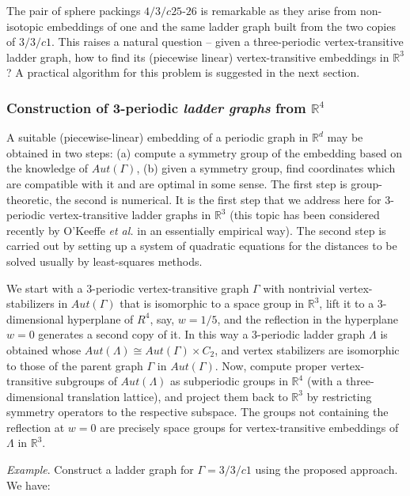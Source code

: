 \documentclass[11pt,a4paper]{article}
\newcommand{\R}{\mathbb R}
\begin{document}
The pair of sphere packings $4/3/c25\text{-}26$ is remarkable as they arise from non-isotopic embeddings of one and the same ladder graph built from the two copies of $3/3/c1$. This raises a natural question -- given a three-periodic vertex-transitive ladder graph, how to find its (piecewise linear) vertex-transitive embeddings in $\R^3$? A practical algorithm for this problem is suggested in the next section.


\subsubsection{Construction of 3-periodic \emph{ladder graphs} from $\R^4$}

A suitable (piecewise-linear) embedding of a periodic graph in $\R^d$ may be obtained in two steps: (a) compute a symmetry group of the embedding based on the knowledge of $Aut(\Gamma)$, (b) given a symmetry group, find coordinates which are compatible with it and are optimal in some sense. The first step is group-theoretic, the second is numerical. It is the first step that we address here for 3-periodic vertex-transitive ladder graphs in $\R^3$ (this topic has been considered recently by O'Keeffe \emph{et al.} \cite{OK25} in an essentially empirical way). The second step is carried out by setting up a system of quadratic equations for the distances to be solved usually by least-squares methods.

We start with a 3-periodic vertex-transitive graph $\Gamma$ with nontrivial vertex-stabilizers in $Aut(\Gamma)$ that is isomorphic to a space group in $\R^3$, lift it to a 3-dimensional hyperplane of $R^4$, say, $w = 1/5$, and the reflection in the hyperplane $w = 0$ generates a second copy of it. In this way a 3-periodic ladder graph $\Lambda$ is obtained whose $Aut(\Lambda) \cong Aut(\Gamma) \times C_2$, and vertex stabilizers are isomorphic to those of the parent graph $\Gamma$ in $Aut(\Gamma)$. Now, compute proper vertex-transitive subgroups of $Aut(\Lambda)$ as subperiodic groups in $\R^4$ (with a three-dimensional translation lattice), and project them back to $\R^3$ by restricting symmetry operators to the respective subspace. The groups not containing the reflection at $w=0$ are precisely space groups for vertex-transitive embeddings of $\Lambda$ in $\R^3$.

\medskip

\noindent \emph{Example}. Construct a ladder graph for $\Gamma = 3/3/c1$ using the proposed approach. We have:
\end{document}
